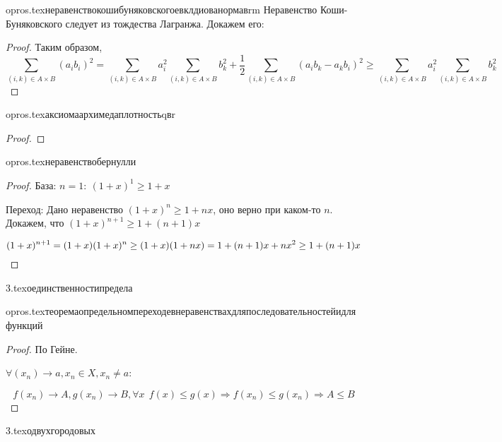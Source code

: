 {opros.tex}{неравенствокошибуняковскогоевклдиованормавrm}
Неравенство Коши-Буняковского следует из тождества Лагранжа. Докажем его:
\begin{proof}
    Таким образом, $$\sum\limits_{(i,k)\in A\times B}(a_ib_i)^2=\sum\limits_{(i,k)\in A\times B}a_i^2\sum\limits_{(i,k)\in A\times B}b_k^2 + \frac{1}{2}\sum\limits_{(i,k)\in A\times B}(a_ib_k-a_kb_i)^2 \geq \sum\limits_{(i,k)\in A\times B}a_i^2\sum\limits_{(i,k)\in A\times B}b_k^2$$
\end{proof}

{opros.tex}{аксиомаархимедаплотностьqвr}
\begin{proof}
\end{proof}

{opros.tex}{неравенствобернулли}
\begin{proof}
    База: $n=1: \ (1+x)^1\geq 1 + x$

    Переход: Дано неравенство $(1+x)^n\geq 1+nx$, оно верно при каком-то $n$. Докажем, что $(1+x)^{n+1}\geq 1 + (n+1)x$

    $$(1+x)^{n+1} = (1+x)(1+x)^n\geq (1+x)(1+nx) = \\ 1 + (n+1)x + nx^2 \geq 1 + (n+1)x$$
\end{proof}

{3.tex}{оединственностипредела}

{opros.tex}{теоремаопредельномпереходевнеравенствахдляпоследовательностейидляфункций}
\begin{proof}
    По Гейне.

    $\forall (x_n)\to a, x_n\in X, x_n\not=a$:

    $$f(x_n)\to A, g(x_n)\to B, \forall x \ \ f(x) \leq g(x) \Rightarrow f(x_n)\leq g(x_n) \Rightarrow A\leq B$$
\end{proof}

{3.tex}{одвухгородовых}

